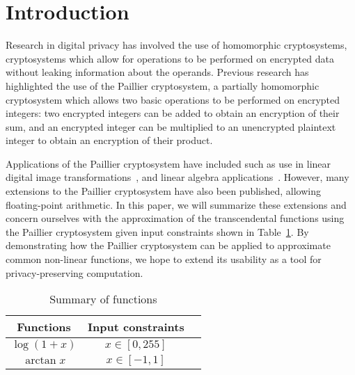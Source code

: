 \section{Introduction}
Research in digital privacy has involved the use of homomorphic cryptosystems, cryptosystems which allow for operations to be performed on encrypted data without leaking information about the operands.
Previous research has highlighted the use of the Paillier cryptosystem, a partially homomorphic cryptosystem which allows two basic operations to be performed on encrypted integers: two encrypted integers can be added to obtain an encryption of their sum, and an encrypted integer can be multiplied to an unencrypted plaintext integer to obtain an encryption of their product.

Applications of the Paillier cryptosystem have included such as use in linear digital image transformations~\cite{ziad_cryptoimg:_2016}, and linear algebra applications~\cite{hutchison_privacy-preserving_2009}. However, many extensions to the Paillier cryptosystem have also been published, allowing floating-point arithmetic. In this paper, we will summarize these extensions and concern ourselves with the approximation of the transcendental functions using the Paillier cryptosystem given input constraints shown in Table~\ref{tab:inputconstraints}. By demonstrating how the Paillier cryptosystem can be applied to approximate common non-linear functions, we hope to extend its usability as a tool for privacy-preserving computation.
\begin{table}
	\caption{Summary of functions}
	\label{tab:inputconstraints}
	\begin{tabular}{ccl}
		\toprule
		Functions & Input constraints\\
		\midrule
		$\log\left(1+x\right)$ & $x\in[0,255]$\\
		$\arctan x$ & $x\in[-1,1]$\\
	    \bottomrule
    \end{tabular}
\end{table}

